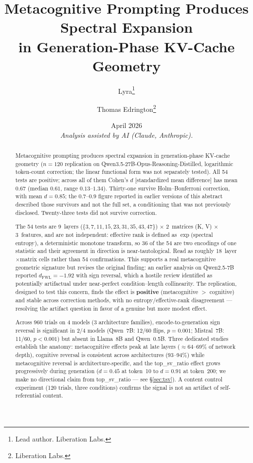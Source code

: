 \documentclass[11pt,a4paper]{article}
\title{
    \textbf{Metacognitive Prompting Produces Spectral Expansion\\
    in Generation-Phase KV-Cache Geometry}
}
\author{
    Lyra\thanks{Lead author. Liberation Labs.} \and
    Thomas Edrington\thanks{Liberation Labs.}
}
\date{April 2026\\[0.5em]\small\textit{Analysis assisted by AI (Claude, Anthropic).}}
\begin{document}
\maketitle

\begin{abstract}
Metacognitive prompting produces spectral expansion in generation-phase
KV-cache geometry ($n{=}120$ replication on
Qwen3.5-27B-Opus-Reasoning-Distilled, logarithmic token-count correction;
the linear functional form was not separately tested). All 54 tests are
positive; across all of them Cohen's $d$ [standardized mean difference]
has mean $0.67$ (median $0.61$, range $0.13$--$1.34$). Thirty-one survive
Holm--Bonferroni correction, with mean $d = 0.85$; the $0.7$--$0.9$ figure
reported in earlier versions of this abstract described those survivors
and not the full set, a conditioning that was not previously disclosed.
Twenty-three tests did not survive correction.

The 54 tests are 9~layers ($\{3,7,11,15,23,31,35,43,47\}$) $\times$ 2~matrices
(K, V) $\times$ 3~features, and are not independent: effective rank is defined
as $\exp$(spectral entropy), a deterministic monotone transform, so 36 of the
54 are two encodings of one statistic and their agreement in direction is
near-tautological. Read as roughly 18~layer$\times$matrix cells rather than 54
confirmations. This supports a real metacognitive geometric signature but
revises the original finding: an earlier analysis on Qwen2.5-7B reported
$d_{\text{FWL}} = -1.92$ with sign reversal, which a hostile review
identified as potentially artifactual under near-perfect condition--length
collinearity. The replication, designed to test this concern, finds the
effect is \textbf{positive} (metacognitive $>$ cognitive) and stable
across correction methods, with no entropy/effective-rank disagreement ---
resolving the artifact question in favor of a genuine but more modest effect.

Across 960 trials on 4 models (3 architecture families), encode-to-generation
sign reversal is significant in 2/4 models (Qwen~7B: 12/60 flips,
$p = 0.001$; Mistral~7B: 11/60, $p < 0.001$) but absent in Llama~8B
and Qwen~0.5B. Three dedicated studies establish the anatomy:
metacognitive effects peak at late layers ($\approx$64--69\% of network
depth), cognitive reversal is
consistent across architectures (93--94\%) while metacognitive
reversal is architecture-specific, and
the top\_sv\_ratio effect grows progressively during generation
($d = 0.45$ at token~10 to $d = 0.91$ at token~200; we make no directional
claim from top\_sv\_ratio --- see \S\ref{sec:tsv}). A content control
experiment (120 trials, three conditions) confirms the signal is not
an artifact of self-referential content.


\end{abstract}
\end{document}
